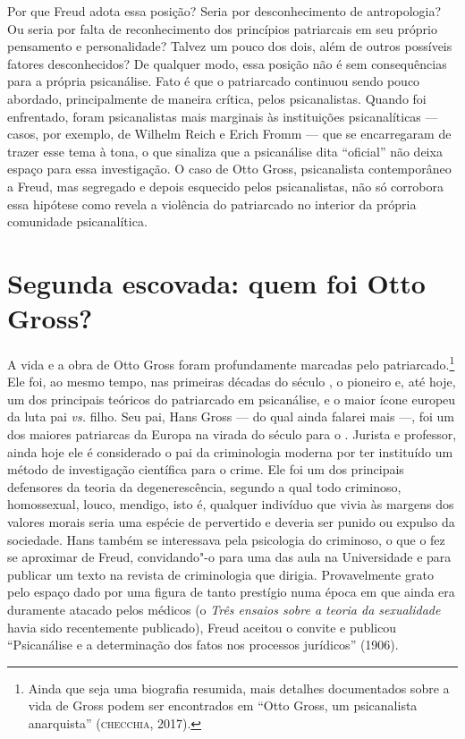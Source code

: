 Por que Freud adota essa posição? Seria por desconhecimento de
antropologia? Ou seria por falta de reconhecimento dos princípios
patriarcais em seu próprio pensamento e personalidade? Talvez um pouco
dos dois, além de outros possíveis fatores desconhecidos? De qualquer
modo, essa posição não é sem consequências para a própria psicanálise.
Fato é que o patriarcado continuou sendo pouco abordado, principalmente
de maneira crítica, pelos psicanalistas. Quando foi enfrentado, foram
psicanalistas mais marginais às instituições psicanalíticas --- casos,
por exemplo, de Wilhelm Reich e Erich Fromm --- que se encarregaram de
trazer esse tema à tona, o que sinaliza que a psicanálise dita
``oficial'' não deixa espaço para essa investigação. O caso de Otto
Gross, psicanalista contemporâneo a Freud, mas segregado e depois
esquecido pelos psicanalistas, não só corrobora essa hipótese como
revela a violência do patriarcado no interior da própria comunidade
psicanalítica.

\section{Segunda escovada: quem foi Otto Gross?}

A vida e a obra de Otto Gross foram profundamente marcadas pelo
patriarcado.\footnote{Ainda que seja uma biografia resumida, mais
  detalhes documentados sobre a vida de Gross podem ser encontrados
  em ``Otto Gross, um psicanalista anarquista'' (\textsc{checchia}, 2017).} Ele foi, ao mesmo
tempo, nas primeiras décadas do século , o pioneiro e, até hoje, um
dos principais teóricos do patriarcado em psicanálise, e o maior ícone
europeu da luta pai \emph{vs.} filho. Seu pai, Hans Gross --- do qual
ainda falarei mais ---, foi um dos maiores patriarcas da Europa na virada
do século  para o . Jurista e professor, ainda hoje ele é
considerado o pai da criminologia moderna por ter instituído um método
de investigação científica para o crime. Ele foi um dos principais
defensores da teoria da degenerescência, segundo a qual todo criminoso,
homossexual, louco, mendigo, isto é, qualquer indivíduo que vivia às
margens dos valores morais seria uma espécie de pervertido e deveria ser
punido ou expulso da sociedade. Hans também se interessava pela
psicologia do criminoso, o que o fez se aproximar de Freud, convidando"-o
para uma das aula na Universidade e para publicar um texto na revista de
criminologia que dirigia. Provavelmente grato pelo espaço dado por uma
figura de tanto prestígio numa época em que ainda era duramente atacado
pelos médicos (o \emph{Três ensaios sobre a teoria da sexualidade} havia
sido recentemente publicado), Freud aceitou o convite e publicou
``Psicanálise e a determinação dos fatos nos processos jurídicos'' (1906).

